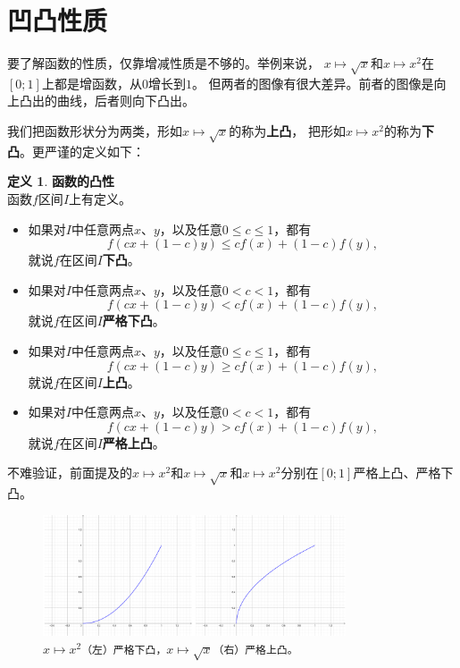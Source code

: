 \documentclass[12pt,UTF8]{ctexbook}
\theoremstyle{definition}
\newtheorem{df}{定义}[section]
\theoremstyle{plain}
\begin{document}
\section{凹凸性质}

要了解函数的性质，仅靠增减性质是不够的。举例来说，
$x\mapsto \sqrt{x}$和$x\mapsto x^2$在$[0;1]$上都是增函数，从$0$增长到$1$。
但两者的图像有很大差异。前者的图像是向上凸出的曲线，后者则向下凸出。

我们把函数形状分为两类，形如$x\mapsto \sqrt{x}$的称为\textbf{上凸}，
把形如$x\mapsto x^2$的称为\textbf{下凸}。更严谨的定义如下：

\begin{df}{\textbf{函数的凸性}}
    \mbox{} \\
    函数$f$区间$I$上有定义。
    \begin{itemize}
        \item 如果对$I$中任意两点$x$、$y$，以及任意$0 \leqslant c \leqslant 1$，都有
        $$ f(cx + (1 - c)y) \leqslant cf(x) + (1 - c)f(y), $$
        就说$f$在区间$I$\textbf{下凸}。
        \item 如果对$I$中任意两点$x$、$y$，以及任意$0 < c < 1$，都有
        $$ f(cx + (1 - c)y) < cf(x) + (1 - c)f(y), $$
        就说$f$在区间$I$\textbf{严格下凸}。
        \item 如果对$I$中任意两点$x$、$y$，以及任意$0 \leqslant c \leqslant 1$，都有
        $$ f(cx + (1 - c)y) \geqslant cf(x) + (1 - c)f(y), $$
        就说$f$在区间$I$\textbf{上凸}。
        \item 如果对$I$中任意两点$x$、$y$，以及任意$0 < c < 1$，都有
        $$ f(cx + (1 - c)y) > cf(x) + (1 - c)f(y), $$
        就说$f$在区间$I$\textbf{严格上凸}。
    \end{itemize}
\end{df}

不难验证，前面提及的$x\mapsto x^2$和$x\mapsto \sqrt{x}$和$x\mapsto x^2$分别在$[0;1]$严格上凸、严格下凸。

\begin{figure}[h]
    \centering
    \includegraphics[width=0.8\textwidth]{tu/凹凸函数1.png}
    \caption*{$x\mapsto x^2$\texttt{（左）严格下凸，}$x\mapsto \sqrt{x}$\texttt{（右）严格上凸。}}
\end{figure}
\end{document}
